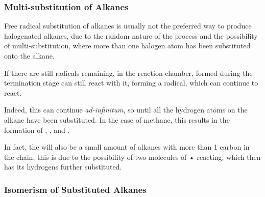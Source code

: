 

		\subsubsection{Multi-substitution of Alkanes}

			Free radical substitution of alkanes is usually not the preferred way to produce
			halogenated alkanes, due to the random nature of the process and the possibility of multi-substitution,
			where more than one halogen atom has been substituted onto the alkane.

			If there are still \ch{\chlorine} radicals remaining, in the reaction chamber,  formed during the
			termination stage can still react with it, forming a  radical, which can continue to react.


			\vspace{-15mm}

			Indeed, this can continue \textit{ad-infinitum}, so until all the hydrogen atoms on the alkane have been substituted.
			In the case of methane, this results in the formation of , ,  and
			.

			In fact, the will also be a small amount of alkanes with more than 1 carbon in the chain; this is due to the
			possibility of two molecules of • reacting, which then has its hydrogens further substituted.





		\pagebreak
		\subsubsection{Isomerism of Substituted Alkanes}

